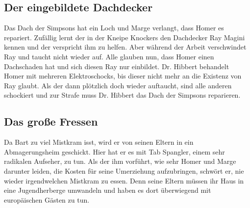 \subsection{Der eingebildete Dachdecker}\label{GABF10}
Das Dach der Simpsons hat ein Loch und Marge verlangt, dass Homer es repariert. Zufällig lernt der in der Kneipe Knockers den Dachdecker Ray Magini kennen und der verspricht ihm zu helfen. Aber während der Arbeit verschwindet Ray und taucht nicht wieder auf. Alle glauben nun, dass Homer einen Dachschaden hat und sich diesen Ray nur einbildet. Dr. Hibbert behandelt Homer mit mehreren Elektroschocks, bis dieser nicht mehr an die Existenz von Ray glaubt. Als der dann plötzlich doch wieder auftaucht, sind alle anderen schockiert und zur Strafe muss Dr. Hibbert das Dach der Simpsons reparieren.


\subsection{Das große Fressen}
Da Bart zu viel Mistkram isst, wird er von seinen Eltern in ein Abmagerungsheim geschickt. Hier hat er es mit Tab Spangler, einem sehr radikalen Aufseher, zu tun. Als der ihm vorführt, wie sehr Homer und Marge darunter leiden, die Kosten für seine Umerziehung aufzubringen, schwört er, nie wieder irgendwelchen Mistkram zu essen. Denn seine Eltern müssen ihr Haus in eine Jugendherberge umwandeln und haben es dort überwiegend mit europäischen Gästen zu tun.


